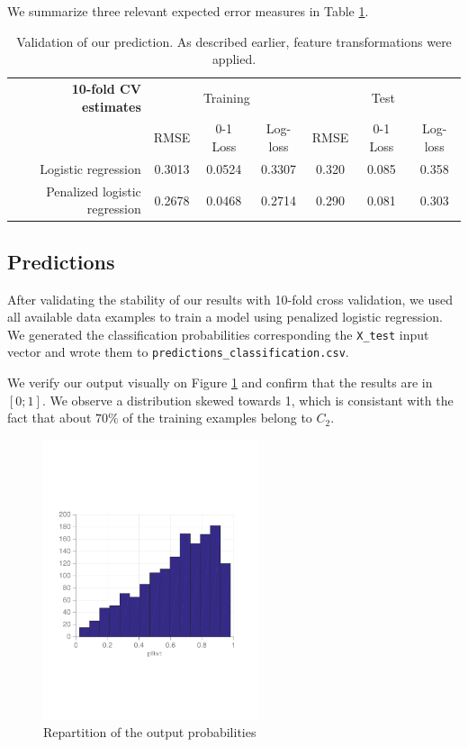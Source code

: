 \documentclass{article} %
\begin{document}
  We summarize three relevant expected error measures in Table \ref{classifier-validation}.

  \begin{table}[ht]
    \center
    \begin{tabular}{|r|c|c|c|c|c|c|}
      \hline
      \textbf{10-fold CV estimates} & \multicolumn{3}{c|}{Training}   & \multicolumn{3}{c|}{Test}    \\
                                    & RMSE      & 0-1 Loss & Log-loss & RMSE   & 0-1 Loss & Log-loss \\
      \hline
      Logistic regression           & 0.3013    & 0.0524   & 0.3307   & 0.320  & 0.085    & 0.358    \\
      \hline
      Penalized logistic regression & 0.2678    & 0.0468   & 0.2714   & 0.290  & 0.081    & 0.303    \\
      \hline
    \end{tabular}
    \caption{Validation of our prediction. As described earlier, feature transformations were applied.}
    \label{classifier-validation}
  \end{table}

  \subsection{Predictions}
  After validating the stability of our results with 10-fold cross validation, we used all available data examples to train a model using penalized logistic regression. We generated the classification probabilities corresponding the \texttt{X\_test} input vector and wrote them to \texttt{predictions\_classification.csv}.

  We verify our output visually on Figure \ref{fig:classification-output} and confirm that the results are in $[0; 1]$. We observe a distribution skewed towards 1, which is consistant with the fact that about $70\%$ of the training examples belong to $C_2$.

  \begin{figure}[ht]
    \center
    \includegraphics[width=2.5in]{figures/classification/output-phat.pdf}
    \caption{Repartition of the output probabilities}
    \label{fig:classification-output}
  \end{figure}
\end{document}
